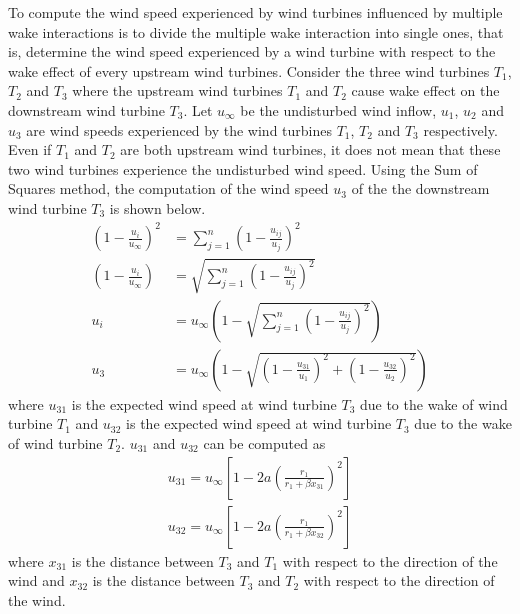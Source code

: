     To compute the wind speed experienced by wind turbines influenced by multiple wake interactions is to divide the multiple wake interaction into single ones, that is, determine the wind speed experienced by a wind turbine with respect to the wake effect of every upstream wind turbines. Consider the three wind turbines $T_1$, $T_2$ and $T_3$ where the upstream wind turbines $T_1$ and $T_2$ cause wake effect on the downstream wind turbine $T_3$. Let $u_\infty$ be the undisturbed wind inflow, $u_1$, $u_2$ and $u_3$ are wind speeds experienced by the wind turbines $T_1$, $T_2$ and $T_3$ respectively. Even if $T_1$ and $T_2$ are both upstream wind turbines, it does not mean that these two wind turbines experience the undisturbed wind speed. Using the Sum of Squares method, the computation of the wind speed $u_3$ of the the downstream wind turbine $T_3$ is shown below.
    \begin{align*}
        \left( 1-\frac{u_i}{u_\infty} \right)^2 &=\sum_{j=1}^{n} \left( 1-\frac{u_{ij}}{u_j} \right)^2 \\
        \left( 1-\frac{u_i}{u_\infty} \right) &= \sqrt{\sum_{j=1}^{n} \left( 1-\frac{u_{ij}}{u_j} \right)^2} \\
        u_i &= u_\infty\left( 1-\sqrt{\sum_{j=1}^{n} \left( 1-\frac{u_{ij}}{u_j} \right)^2} \right) \\
        u_3 &= u_\infty\left( 1-\sqrt{\left( 1-\frac{u_{31}}{u_1} \right)^2 + \left( 1-\frac{u_{32}}{u_2} \right)^2} \right)
    \end{align*}
    where $u_{31}$ is the expected wind speed at wind turbine $T_3$ due to the wake of wind turbine $T_1$ and $u_{32}$ is the expected wind speed at wind turbine $T_3$ due to the wake of wind turbine $T_2$. $u_{31}$ and $u_{32}$ can be computed as
    \begin{align*}
        u_{31} = u_\infty \left[ 1-2a\left( \frac{r_1}{r_1+\beta x_{31}} \right)^2 \right] \\
        u_{32} = u_\infty \left[ 1-2a\left( \frac{r_1}{r_1+\beta x_{32}} \right)^2 \right]
    \end{align*}
    where $x_{31}$ is the distance between $T_3$ and $T_1$ with respect to the direction of the wind and $x_{32}$ is the distance between $T_3$ and $T_2$ with respect to the direction of the wind.
    
